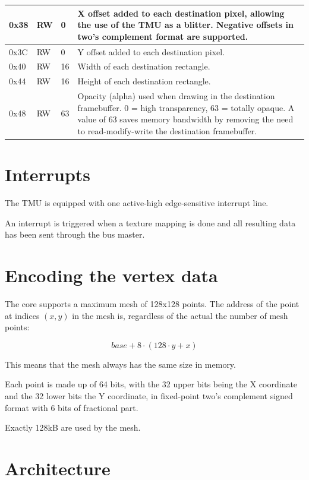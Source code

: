 \documentclass[a4paper,11pt]{article}
\begin{document}
\begin{tabularx}{\textwidth}{|l|l|l|X|}
\hline
0x38 & RW & 0 & X offset added to each destination pixel, allowing the use of the TMU as a blitter. Negative offsets in two's complement format are supported. \\
\hline
0x3C & RW & 0 & Y offset added to each destination pixel. \\
\hline
0x40 & RW & 16 & Width of each destination rectangle. \\
\hline
0x44 & RW & 16 & Height of each destination rectangle. \\
\hline
0x48 & RW & 63 & Opacity (alpha) used when drawing in the destination framebuffer. 0 = high transparency, 63 = totally opaque. A value of 63 saves memory bandwidth by removing the need to read-modify-write the destination framebuffer. \\
\hline
\end{tabularx}

\section{Interrupts}
The TMU is equipped with one active-high edge-sensitive interrupt line.

An interrupt is triggered when a texture mapping is done and all resulting data has been sent through the bus master.

\section{Encoding the vertex data}
The core supports a maximum mesh of 128x128 points. The address of the point at indices $ (x, y) $ in the mesh is, regardless of the actual the number of mesh points:

\begin{equation*}
base + 8 \cdot (128 \cdot y + x)
\end{equation*}

This means that the mesh always has the same size in memory.

Each point is made up of 64 bits, with the 32 upper bits being the X coordinate and the 32 lower bits the Y coordinate, in fixed-point two's complement signed format with 6 bits of fractional part.

Exactly 128kB are used by the mesh.

\section{Architecture}
\end{document}
